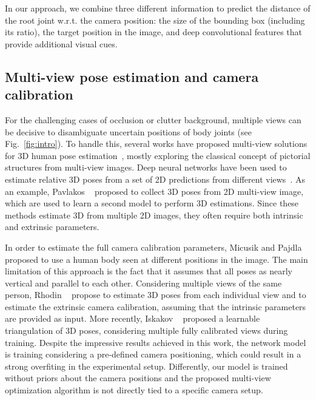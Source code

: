\documentclass[10pt,twocolumn,letterpaper]{article}
\newcommand{\rev}[1]{#1}
\newcommand{\revb}[1]{{#1}}
\begin{document}
In our approach, we combine three different information to predict the distance
of the root joint \revb{w.r.t. the camera position}: the size of the bounding box (including its ratio), the \revb{target}
position in the image, and deep convolutional features that provide additional
visual cues.


\subsection{\revb{Multi-view pose estimation and camera calibration}}

\rev{
For the challenging cases of occlusion or clutter background, multiple views
can be decisive to disambiguate uncertain positions of body joints (see
Fig.~\ref{fig:intro}).
To handle this,} several works have proposed multi-view solutions for 3D
human pose estimation~\cite{belagiannis20143d, amin2013multi, burenius20133d,
Belagiannis_PAMI_2016, Hofmann2012}, mostly exploring the classical concept of
pictorial structures from multi-view images.
Deep neural networks have been used to estimate relative
3D poses from a set of 2D predictions from different
views~\cite{rhodin2018learning, pavlakos2017harvesting, NUNEZ2019335}.
As an example, Pavlakos \etal~\cite{pavlakos2017harvesting} proposed to
collect 3D poses from 2D multi-view image, which are used to learn
a second model to perform 3D estimations.
Since these methods estimate 3D from multiple 2D images, they often require
both intrinsic and extrinsic parameters.


\revb{
In order to estimate the full camera calibration parameters, Micusik and
Pajdla~\cite{micusik2010simultaneous} proposed to use a human body seen
at different positions in the image. The main limitation of this approach
is the fact that it assumes that all poses as nearly vertical and parallel
to each other. Considering multiple views of the same person,
Rhodin \etal~\cite{rhodin2018learning} propose to estimate 3D poses from each
individual view and to estimate the extrinsic camera calibration, assuming
that the intrinsic parameters are provided as input.
More recently, Iskakov \etal~\cite{iskakov2019learnable} proposed a learnable
triangulation of 3D poses, considering multiple fully calibrated views
during training. Despite the impressive results achieved in this work,
the network model is training considering a pre-defined camera positioning,
which could result in a strong overfiting in the experimental setup.
Differently, our model is trained without priors about the camera positions and
the proposed multi-view optimization algorithm is not directly tied to a specific camera setup.
}
\end{document}

